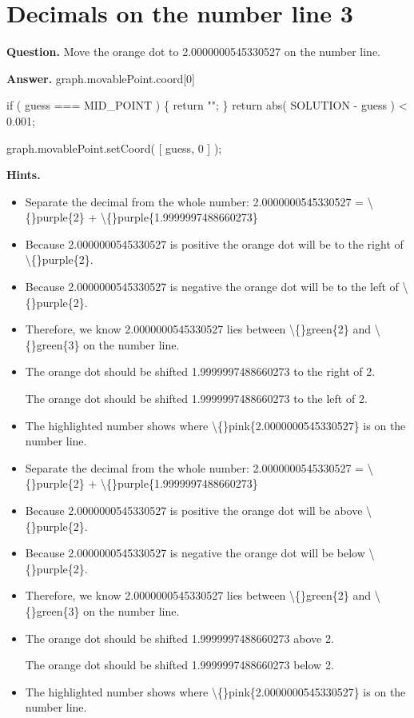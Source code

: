 \documentclass{article}
\begin{document}
\section*{Decimals on the number line 3}
\textbf{Question.} Move the orange dot to 2.0000000545330527 on the number line.

\textbf{Answer.} graph.movablePoint.coord[0] 
                
                    if ( guess === MID\_POINT ) \{
                        return "";
                    \}
                    return abs( SOLUTION - guess ) < 0.001;
                
                
                    graph.movablePoint.setCoord( [ guess, 0 ] );

\textbf{Hints.}
\begin{itemize}
  \item Separate the decimal from the whole number:
                    2.0000000545330527 = \textbackslash\{\}purple\{2\} + \textbackslash\{\}purple\{1.9999997488660273\}
  \item Because 2.0000000545330527 is positive the orange dot
                    will be to the right of \textbackslash\{\}purple\{2\}.
  \item Because 2.0000000545330527 is negative the orange dot will
                    be to the left of \textbackslash\{\}purple\{2\}.
  \item Therefore, we know 2.0000000545330527 lies between
                    \textbackslash\{\}green\{2\} and
                    \textbackslash\{\}green\{3\} on the number line.
  \item The orange dot should be shifted 1.9999997488660273
                        to the right of 2.
                    
                        The orange dot should be shifted 1.9999997488660273
                        to the left of 2.
  \item The highlighted number shows where \textbackslash\{\}pink\{2.0000000545330527\} is on the number line.
  \item Separate the decimal from the whole number:
                    2.0000000545330527 = \textbackslash\{\}purple\{2\} + \textbackslash\{\}purple\{1.9999997488660273\}
  \item Because 2.0000000545330527 is positive the orange dot
                    will be above \textbackslash\{\}purple\{2\}.
  \item Because 2.0000000545330527 is negative the orange dot will
                    be below \textbackslash\{\}purple\{2\}.
  \item Therefore, we know 2.0000000545330527 lies between
                    \textbackslash\{\}green\{2\} and
                    \textbackslash\{\}green\{3\} on the number line.
  \item The orange dot should be shifted 1.9999997488660273
                        above 2.
                    
                        The orange dot should be shifted 1.9999997488660273
                        below 2.
  \item The highlighted number shows where \textbackslash\{\}pink\{2.0000000545330527\} is on the number line.
\end{itemize}
\end{document}
